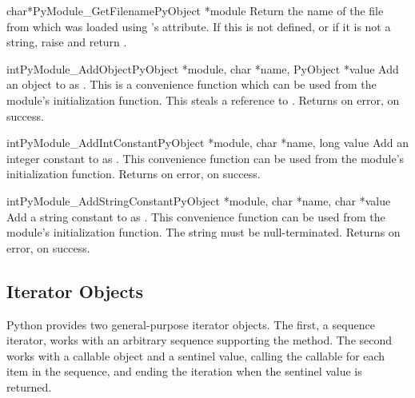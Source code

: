 \begin{cfuncdesc}{char*}{PyModule_GetFilename}{PyObject *module}
  Return the name of the file from which  was loaded using
  's  attribute.  If this is not defined,
  or if it is not a string, raise  and return
  \NULL{}.
\end{cfuncdesc}

\begin{cfuncdesc}{int}{PyModule_AddObject}{PyObject *module,
                                           char *name, PyObject *value}
  Add an object to  as .  This is a convenience
  function which can be used from the module's initialization
  function.  This steals a reference to .  Returns
   on error,  on success.
\end{cfuncdesc}

\begin{cfuncdesc}{int}{PyModule_AddIntConstant}{PyObject *module,
                                                char *name, long value}
  Add an integer constant to  as .  This
  convenience function can be used from the module's initialization
  function. Returns  on error,  on success.
\end{cfuncdesc}

\begin{cfuncdesc}{int}{PyModule_AddStringConstant}{PyObject *module,
                                                   char *name, char *value}
  Add a string constant to  as .  This
  convenience function can be used from the module's initialization
  function.  The string  must be null-terminated.  Returns
   on error,  on success.
\end{cfuncdesc}


\subsection{Iterator Objects \label{iterator-objects}}

Python provides two general-purpose iterator objects.  The first, a
sequence iterator, works with an arbitrary sequence supporting the
 method.  The second works with a callable
object and a sentinel value, calling the callable for each item in the
sequence, and ending the iteration when the sentinel value is
returned.

